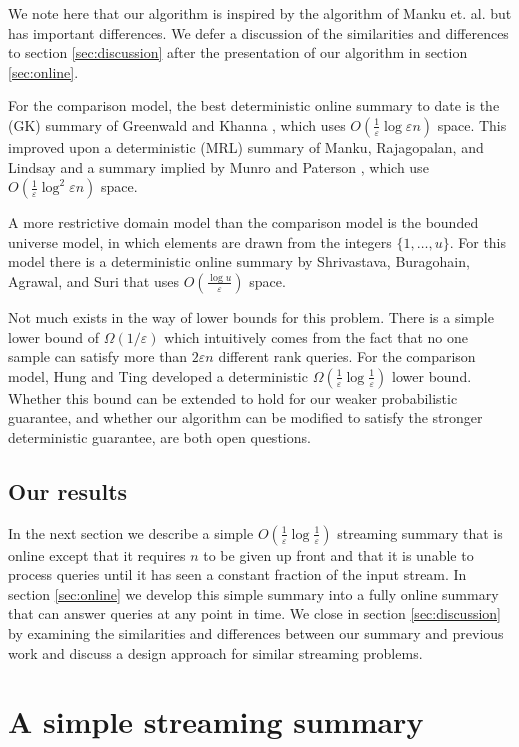 \documentclass{article}
\theoremstyle{plain}
\def\ep{\varepsilon}
\newcommand{\p}[1]{(#1)}
\newcommand{\OO}[1]{O\p{#1}}
\newcommand{\OM}[1]{\Omega\p{#1}}
\begin{document}
We note here that our algorithm is inspired by the algorithm of Manku et. al.
but has important differences. We defer a discussion of the similarities and
differences to section \ref{sec:discussion} after the presentation of our
algorithm in section \ref{sec:online}.

For the comparison model, the best deterministic online summary to date is the
(GK) summary of Greenwald and Khanna \cite{GK2001}, which uses
$\OO{\frac{1}{\ep} \log \ep n}$ space. This improved upon a deterministic (MRL)
summary of Manku, Rajagopalan, and Lindsay \cite{MRL1998} and a summary implied
by Munro and Paterson \cite{MP1978}, which use $\OO{\frac{1}{\ep} \log^2 \ep n}$
space.

A more restrictive domain model than the comparison model is the bounded
universe model, in which elements are drawn from the integers $\{1, \ldots,
u\}$. For this model there is a deterministic online summary by Shrivastava,
Buragohain, Agrawal, and Suri \cite{SBAS2004} that uses $\OO{\frac{\log
    u}{\ep}}$ space.

Not much exists in the way of lower bounds for this problem. There is a simple
lower bound of $\OM{1/\ep}$ which intuitively comes from the fact that no one
sample can satisfy more than $2 \ep n$ different rank queries. For the
comparison model, Hung and Ting \cite{HT2010} developed a deterministic
$\OM{\frac{1}{\ep} \log \frac{1}{\ep}}$ lower bound. Whether this bound can be
extended to hold for our weaker probabilistic guarantee, and whether our
algorithm can be modified to satisfy the stronger deterministic guarantee, are
both open questions.



\subsection{Our results}

In the next section we describe a simple $\OO{\frac{1}{\ep} \log \frac{1}{\ep}}$
streaming summary that is online except that it requires $n$ to be given up
front and that it is unable to process queries until it has seen a constant
fraction of the input stream. In section \ref{sec:online} we develop this simple
summary into a fully online summary that can answer queries at any point in
time. We close in section \ref{sec:discussion} by examining the similarities and
differences between our summary and previous work and discuss a design approach
for similar streaming problems.
 
\section{A simple streaming summary}
\label{sec:simple}
\end{document}
